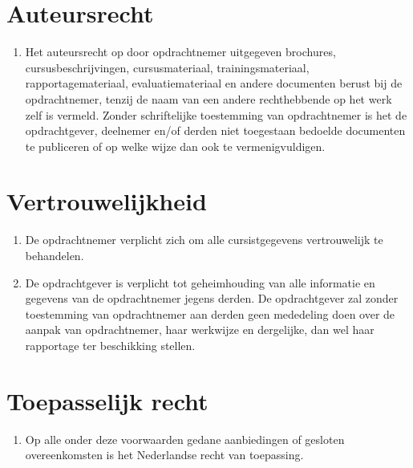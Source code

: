 \documentclass[a4paper]{article}
\begin{document}
\section{Auteursrecht}

\begin{enumerate}
	\item Het auteursrecht op door opdrachtnemer uitgegeven brochures, cursusbeschrijvingen, cursusmateriaal, trainingsmateriaal, rapportagemateriaal, evaluatiemateriaal en andere documenten berust bij de opdrachtnemer, tenzij de naam van een andere rechthebbende op het werk zelf is vermeld. Zonder schriftelijke toestemming van opdrachtnemer is het de opdrachtgever, deelnemer en/of derden niet toegestaan bedoelde documenten te publiceren of op welke wijze dan ook te vermenigvuldigen.
\end{enumerate}

\section{Vertrouwelijkheid}

\begin{enumerate}
	\item De opdrachtnemer verplicht zich om alle cursistgegevens vertrouwelijk te behandelen.
	\item De opdrachtgever is verplicht tot geheimhouding van alle informatie en gegevens van de opdrachtnemer jegens derden. De opdrachtgever zal zonder toestemming van opdrachtnemer aan derden geen mededeling doen over de aanpak van opdrachtnemer, haar werkwijze en dergelijke, dan wel haar rapportage ter beschikking stellen.
\end{enumerate}

\section{Toepasselijk recht}

\begin{enumerate}
	\item Op alle onder deze voorwaarden gedane aanbiedingen of gesloten overeenkomsten is het Nederlandse recht van toepassing.
\end{enumerate}
\end{document}
